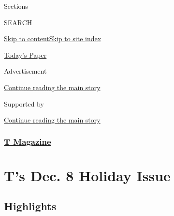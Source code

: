 Sections

SEARCH

\protect\hyperlink{site-content}{Skip to
content}\protect\hyperlink{site-index}{Skip to site index}

\href{https://myaccount.nytimes3xbfgragh.onion/auth/login?response_type=cookie\&client_id=vi}{}

\href{https://www.nytimes3xbfgragh.onion/section/todayspaper}{Today's
Paper}

Advertisement

\protect\hyperlink{after-top}{Continue reading the main story}

Supported by

\protect\hyperlink{after-sponsor}{Continue reading the main story}

\hypertarget{t-magazine}{%
\subsubsection{\texorpdfstring{\href{/section/t-magazine}{T
Magazine}}{T Magazine}}\label{t-magazine}}

\hypertarget{ts-dec-8-holiday-issue}{%
\section{T's Dec. 8 Holiday Issue}\label{ts-dec-8-holiday-issue}}

\hypertarget{highlights}{%
\subsection{Highlights}\label{highlights}}

